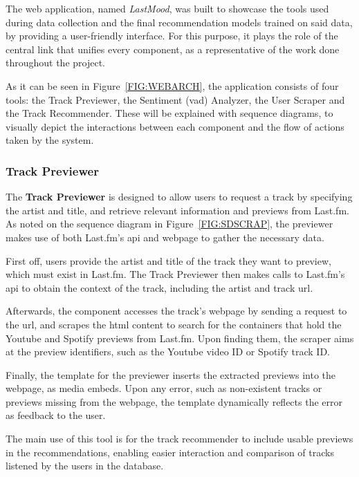 The web application, named \emph{LastMood}, was built to showcase the tools used during data collection and the final recommendation models trained on said data, by providing a user-friendly interface. For this purpose, it plays the role of the central link that unifies every component, as a representative of the work done throughout the project.

As it can be seen in Figure~\ref{FIG:WEBARCH}, the application consists of four tools: the Track Previewer, the Sentiment (\acs{vad}) Analyzer, the User Scraper and the Track Recommender. These will be explained with sequence diagrams, to visually depict the interactions between each component and the flow of actions taken by the system.

\subsubsection{Track Previewer}

The \textbf{Track Previewer} is designed to allow users to request a track by specifying the artist and title, and retrieve relevant information and previews from Last.fm\@. As noted on the sequence diagram in Figure~\ref{FIG:SDSCRAP}, the previewer makes use of both Last.fm's \acs{api} and webpage to gather the necessary data.

\begin{compactenum}[\bfseries 1.]
    \item First off, users provide the artist and title of the track they want to preview, which must exist in Last.fm\@. The Track Previewer then makes calls to Last.fm's \acs{api} to obtain the context of the track, including the artist and track \acs{url}\@.
    \item Afterwards, the component accesses the track's webpage by sending a request to the \acs{url}, and scrapes the \acs{html} content to search for the containers that hold the Youtube and Spotify previews from Last.fm\@. Upon finding them, the scraper aims at the preview identifiers, such as the Youtube video ID or Spotify track ID\@.
    \item Finally, the template for the previewer inserts the extracted previews into the webpage, as media embeds. Upon any error, such as non-existent tracks or previews missing from the webpage, the template dynamically reflects the error as feedback to the user.
\end{compactenum}

The main use of this tool is for the track recommender to include usable previews in the recommendations, enabling easier interaction and comparison of tracks listened by the users in the database.

